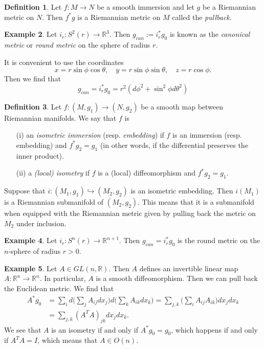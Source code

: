\documentclass{amsart}
\numberwithin{equation}{section}
\theoremstyle{definition}
\newtheorem{definition}{Definition} [section]
\newtheorem{example}[definition]{Example}
\theoremstyle{theorem}
\begin{document}
\begin{definition}
Let $f : M \to N$ be a smooth immersion and let $g$ be a Riemannian metric on $N$. Then $f^*g$ is a Riemannian metric on $M$ called the {\em pullback}. 
\end{definition}

\begin{example}
Let $i_r : S^2(r) \to \mathbb{R}^3$. Then $g_{can} := i_r^*g_0$ is known as the 
{\em canonical metric} or {\em round metric} on the sphere of radius $r$. 

It is convenient to use the coordinates 
$$
x = r \sin \phi \cos \theta,\quad 
y = r \sin \phi \sin \theta,\quad
z = r \cos \phi.
$$
Then we find that 
\[
g_{can} = i_r^*g_0 = r^2(d\phi^2 + \sin^2\phi d\theta^2)
\]
\end{example}

\begin{definition}
Let $f : (M,g_1) \to (N, g_2)$ be a smooth map between Riemannian manifolds. We say that $f$ is 
\begin{enumerate}
\item[(i)] an {\em isometric immersion} (resp. {\em embedding}) if $f$ is an 
immersion (resp. embedding) and $f^*g_2=  g_1$ (in other words, if the differential preserves the inner product). 
\item[(ii)] a {\em (local) isometry} if $f$ is a (local) diffeomorphism and $f^*g_2=  g_1$. 
\end{enumerate}
\end{definition}

Suppose that $i : (M_1, g_1) \hookrightarrow (M_2, g_2)$ is an isometric embedding.  Then $i(M_1)$ is a Riemannian submanifold of $(M_2, g_2)$. This means that it is a submanifold when equipped with the Riemannian metric given by pulling back the metric on $M_2$ under inclusion. 

\begin{example}
Let $i_r : S^n(r) \to \mathbb{R}^{n+1}$. Then $g_{can} = i_r^* g_0$ is the round metric on the $n$-sphere of radius $r > 0$. 
\end{example}

\begin{example}
Let $A \in GL(n,\mathbb{R})$. Then $A$ defines an invertible linear map $A : \mathbb{R}^n \to \mathbb{R}^n$. In particular, $A$ is a smooth diffeomorphism. Then we can pull back the Euclidean metric. We find that 
\begin{align*}
A^*g_0 &= \sum_{i} d\Big(\sum_{j} A_{ij} dx_j\Big) d\Big(\sum_{k} A_{ik} dx_k\Big) = 
\sum_{j,k} \Big(\sum_{i} A_{ij} A_{ik}\Big) dx_j dx_k \\
&= \sum_{j,k} (A^T A)_{jk} dx_j dx_k.
\end{align*}
We see that $A$ is an isometry if and only if $A^*g_0 = g_0$, which happens if and only if $A^TA = I$, which means that $A \in O(n)$. 
\end{example}
\end{document}
